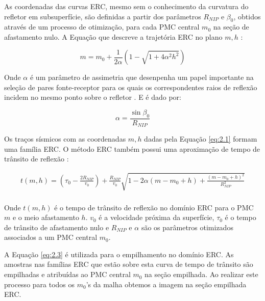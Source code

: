 As coordenadas das curvas ERC, mesmo sem o conhecimento da curvatura do refletor em subsuperfície, são definidas
a partir dos parâmetros $R_{NIP}$ e $\beta_0$, obtidos através de um processo de otimização, 
para cada PMC central $m_0$ na seção de afastamento nulo. A Equação que descreve a trajetória ERC no plano $m, h$ \cite{cre}:

\begin{equation}
 \label{eq:2.1}
 m= m_0 + \frac{1}{2\alpha} (1-\sqrt{1+4\alpha^2h^2})
\end{equation}

Onde $\alpha$ é um parâmetro de assimetria que desenpenha um papel importante na seleção de pares fonte-receptor para os quais
os correspondentes raios de reflexão incidem no mesmo ponto sobre o refletor \cite{tygel}. E é dado por:

\begin{equation}
\label{eq:2.2}
 \alpha=\frac{\sin{\beta_0}}{R_{NIP}}
\end{equation}

Os traços sísmicos com as coordenadas $m, h$ dadas pela Equação \ref{eq:2.1} formam uma família ERC.
O método ERC também possui uma aproximação de tempo de trânsito de
reflexão \cite{cre}:

\begin{multline}
\label{eq:2.3}
t(m,h)= \left( \tau_0-\frac{2R_{NIP}}{v_0} \right) 
+\frac{R_{NIP}}{v_0}\sqrt{1-2\alpha(m-m_0+h)+\frac{(m-m_0+h)^2}{R_{NIP}^2}} \\
\end{multline}

Onde $t(m,h)$ é o tempo de trânsito de reflexão no domínio ERC para o PMC $m$ e o meio afastamento $h$.
$v_0$ é a velocidade próxima da superfície, $\tau_0$ é o tempo de trânsito de afastamento nulo e 
$R_{NIP}$ e $\alpha$ são os parâmetros otimizados associados a um PMC central $m_0$.

A Equação \ref{eq:2.3} é utilizada para o empilhamento no domínio ERC. As amostras nas famílias ERC 
que estão sobre esta curva de tempo de trânsito são empilhadas e atribuídas ao PMC central $m_0$ na seção empilhada.
Ao realizar este processo para todos os $m_0$'s da malha obtemos a imagem na seção empilhada ERC.

